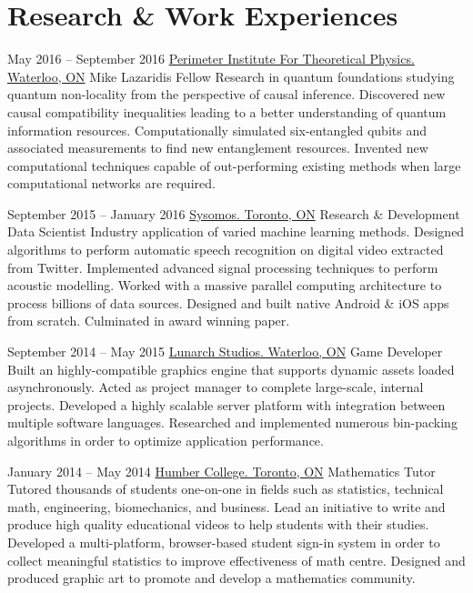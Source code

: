 \documentclass{article}
\begin{document}
    \section{Research \& Work Experiences}
    \begin{experiencelist}
        \item{
            May 2016 -- September 2016
        }{
            \href{www.perimeterinstitute.ca}{Perimeter Institute For Theoretical Physics. Waterloo, ON}
        }{
            Mike Lazaridis Fellow
        }{
            Research in quantum foundations studying quantum non-locality from the perspective of causal inference. Discovered new causal compatibility inequalities leading to a better understanding of quantum information resources. Computationally simulated six-entangled qubits and associated measurements to find new entanglement resources. Invented new computational techniques capable of out-performing existing methods when large computational networks are required.
        }

        \item{
            September 2015 -- January 2016
            }{
                \href{www.sysomos.com}{Sysomos. Toronto, ON}
            }{
                Research \& Development Data Scientist
            }{
                Industry application of varied machine learning methods. Designed algorithms to perform automatic speech recognition on digital video extracted from Twitter. Implemented advanced signal processing techniques to perform acoustic modelling. Worked with a massive parallel computing architecture to process billions of data sources. Designed and built native Android \& iOS apps from scratch. Culminated in award winning paper.
            }

        \item{
            September 2014 -- May 2015
            }{
                \href{www.lunarchstudios.com}{Lunarch Studios. Waterloo, ON}
            }{
                Game Developer
            }{
                Built an highly-compatible graphics engine that supports dynamic assets loaded asynchronously. Acted as project manager to complete large-scale, internal projects. Developed a highly scalable server platform with integration between multiple software languages. Researched and implemented numerous bin-packing algorithms in order to optimize application performance.
            }

        \item{
            January 2014 -- May 2014
            }{
                \href{www.humber.ca}{Humber College. Toronto, ON}
            }{
                Mathematics Tutor
            }{
                Tutored thousands of students one-on-one in fields such as statistics, technical math, engineering, biomechanics, and business. Lead an initiative to write and produce high quality educational videos to help students with their studies. Developed a multi-platform, browser-based student sign-in system in order to collect meaningful statistics to improve effectiveness of math centre. Designed and produced graphic art to promote and develop a mathematics community.
            }


\end{experiencelist}
\end{document}
